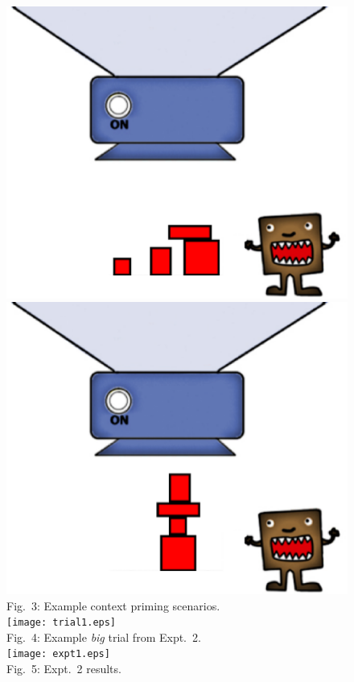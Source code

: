 \documentclass[12pt]{article}
\begin{document}
 \begin{figure}
 	\centering
 	\vspace{-10pt}
 	\includegraphics[width=.49\linewidth]{context13nodolly.eps}
 	\includegraphics[width=.49\linewidth]{context13regnodolly.eps}\\
 	Fig.~3: Example context priming scenarios.\\[5pt]
 	\hspace{-5pt}\texttt{[image: trial1.eps]}\\
 	Fig.~4: Example \emph{big} trial from Expt.~2.\\
 	\mbox{\hspace{-11pt}\texttt{[image: expt1.eps]}}\\
 	\vspace{-8pt}
 	Fig.~5: Expt.~2 results.
 \end{figure}
\end{document}
